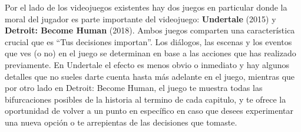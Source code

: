 








Por el lado de los videojuegos existentes hay dos juegos en particular donde la moral del jugador es parte importante del videojuego: \textbf{Undertale} (2015) y \textbf{Detroit: Become Human} (2018). Ambos juegos comparten una característica crucial que es ``Tus decisiones importan''. Los diálogos, las escenas y los eventos que ves (o no) en el juego se determinan en base a las acciones que has realizado previamente. En Undertale el efecto es menos obvio o inmediato y hay algunos detalles que no sueles darte cuenta hasta más adelante en el juego, mientras que por otro lado en Detroit: Become Human, el juego te muestra todas las bifurcaciones posibles de la historia al termino de cada capitulo, y te ofrece la oportunidad de volver a un punto en específico en caso que desees experimentar una nueva opción o te arrepientas de las decisiones que tomaste.

